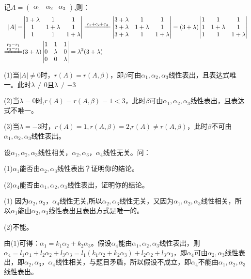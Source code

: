 \documentclass[a4paper]{report}
\begin{document}
\begin{jie}
记$A=\begin{pmatrix}
  \alpha_1&\alpha_2&\alpha_3
\end{pmatrix}$,则：
\begin{align*}
|A|=&\begin{vmatrix}
1+\lambda&1&1\\
1&1+\lambda&1\\
1&1&1+\lambda
\end{vmatrix}\xlongequal{c_{1}+c_{2}+c_3}
\begin{vmatrix}
3+\lambda&1&1\\
3+\lambda&1+\lambda&1\\
3+\lambda&1&1+\lambda
\end{vmatrix}=(3+\lambda)
\begin{vmatrix}
1&1&1\\
1&1+\lambda&1\\
1&1&1+\lambda
\end{vmatrix}\\
\xlongequal{\substack{r_2-r_1 \\ r_3-r_1}}&
(3+\lambda)\begin{vmatrix}
1&1&1\\
0&\lambda&0\\
0&0&\lambda
\end{vmatrix}=\lambda^2(3+\lambda)
\end{align*}

(1)当$|A|\neq 0$时，$r(A)=r(A,\beta)$，即$\beta$可由$\alpha_1,\alpha_2,\alpha_3$线性表出，且表达式唯一。此时$\lambda\neq0$且$\lambda\neq -3$

(2)当$\lambda=0$时,$r(A)=r(A,\beta)=1<3$，此时$\beta$可由$\alpha_1,\alpha_2,\alpha_3$线性表出，且表达式不唯一。

(3)当$\lambda=-3$时，$r(A)=1,r(A,\beta)=2$,$r(A)\neq r(A,\beta)$，此时$\beta$不可由$\alpha_1,\alpha_2,\alpha_3$线性表出。
\end{jie}

\EX 设$\alpha_1,\alpha_2,\alpha_3$线性相关，$\alpha_2,\alpha_3，\alpha_4$线性无关。问：

(1)$\alpha_1$能否由$\alpha_2,\alpha_3$线性表出？证明你的结论。

(2)$\alpha_4$能否由$\alpha_1,\alpha_2,\alpha_3$线性表出，证明你的结论。

\begin{zhengming}
(1)
因为$\alpha_2,\alpha_3，\alpha_4$线性无关,所以$\alpha_2,\alpha_3$线性无关，又因为$\alpha_1,\alpha_2,\alpha_3$线性相关，所以$\alpha_1$能由$\alpha_2,\alpha_3$线性表出且表出方式是唯一的。

(2)不能。

由(1)可得：$\alpha_1=k_1\alpha_2+k_2\alpha_3$。假设$\alpha_4$能由$\alpha_1,\alpha_2,\alpha_3$线性表出，则$\alpha_4=l_1\alpha_1+l_2\alpha_2+l_3\alpha_3=l_1(k_1\alpha_2+k_2\alpha_3)+l_2\alpha_2+l_3\alpha_3$，即$\alpha_4$可由$\alpha_2,\alpha_3$线性表出，即$\alpha_2,\alpha_3，\alpha_4$线性相关，与题目矛盾，所以假设不成立，即$\alpha_4$不能由$\alpha_1,\alpha_2,\alpha_3$线性表出。
\end{zhengming}
\end{document}
